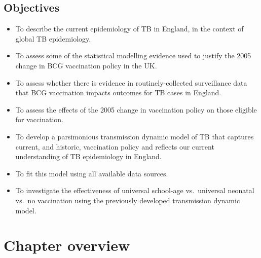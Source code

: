 \documentclass[11pt,twoside]{bristolthesis}
\providecommand{\tightlist}{%
  \setlength{\itemsep}{0pt}\setlength{\parskip}{0pt}}
\begin{document}
  \hypertarget{objectives}{%
  \subsection{Objectives}\label{objectives}}
  \begin{itemize}
  \tightlist
  \item
    To describe the current epidemiology of TB in England, in the context of global TB epidemiology.
  \item
    To assess some of the statistical modelling evidence used to justify the 2005 change in BCG vaccination policy in the UK.
  \item
    To assess whether there is evidence in routinely-collected surveillance data that BCG vaccination impacts outcomes for TB cases in England.
  \item
    To assess the effects of the 2005 change in vaccination policy on those eligible for vaccination.
  \item
    To develop a parsimonious transmission dynamic model of TB that captures current, and historic, vaccination policy and reflects our current understanding of TB epidemiology in England.
  \item
    To fit this model using all available data sources.
  \item
    To investigate the effectiveness of universal school-age vs.~universal neonatal vs.~no vaccination using the previously developed transmission dynamic model.
  \end{itemize}
  \hypertarget{chapter-overview}{%
  \section{Chapter overview}\label{chapter-overview}}
\end{document}
